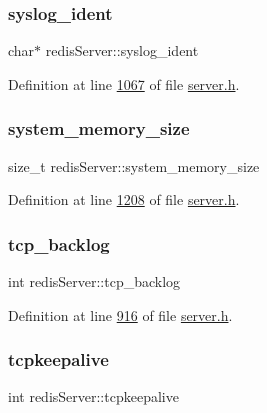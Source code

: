 \subsubsection{\texorpdfstring{syslog\+\_\+ident}{syslog\_ident}}
{\footnotesize\ttfamily char$\ast$ redis\+Server\+::syslog\+\_\+ident}



Definition at line \hyperlink{server_8h_source_l01067}{1067} of file \hyperlink{server_8h_source}{server.\+h}.

\mbox{\label{structredisServer_a36ff3c22e12565d894e9a536c859a0e3}} 
\subsubsection{\texorpdfstring{system\+\_\+memory\+\_\+size}{system\_memory\_size}}
{\footnotesize\ttfamily size\+\_\+t redis\+Server\+::system\+\_\+memory\+\_\+size}



Definition at line \hyperlink{server_8h_source_l01208}{1208} of file \hyperlink{server_8h_source}{server.\+h}.

\mbox{\label{structredisServer_a87d1d6ec9e2f7a6a32c2d164361ce0d3}} 
\subsubsection{\texorpdfstring{tcp\+\_\+backlog}{tcp\_backlog}}
{\footnotesize\ttfamily int redis\+Server\+::tcp\+\_\+backlog}



Definition at line \hyperlink{server_8h_source_l00916}{916} of file \hyperlink{server_8h_source}{server.\+h}.

\mbox{\label{structredisServer_ac5bee5de93d2c608667ca0690d457fa6}} 
\subsubsection{\texorpdfstring{tcpkeepalive}{tcpkeepalive}}
{\footnotesize\ttfamily int redis\+Server\+::tcpkeepalive}



